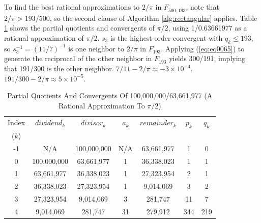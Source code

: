 \documentclass{esub2acm}
\begin{document}
To find the best rational approximations to $2/ \pi$ in $F_{500, \overline{193}}$,
note that $2/ \pi > 193/500$, so the second clause of Algorithm \ref{alg:rectangular}
applies.  Table \ref{tbl:cfexpansrappiovertwo} shows the partial quotients and convergents
of $\pi / 2$, using 1/0.63661977 as a rational approximation of $\pi /2$.  $s_3$
is the highest-order convergent with $q_k \leq 193$, so $s_3^{-1} = (11/7)^{-1}$ is one
neighbor to $2/ \pi$ in $F_{\overline{193}}$.  Applying (\ref{eq:eq0065}) to generate
the reciprocal of the other neighbor in $F_{\overline{193}}$ yields 300/191, implying that
191/300 is the other neighbor.  $7/11 - 2/\pi \approx -3 \times 10^{-4}$.
$191/300 - 2/\pi \approx 5 \times 10^{-5}$.

\begin{table}
\caption{Partial Quotients And Convergents Of 100,000,000/63,661,977
        (A Rational Approximation To $\pi / 2$)}
\label{tbl:cfexpansrappiovertwo}
\begin{center}
\begin{tabular}{|c|c|c|c|c|c|c|}
\hline
\small{Index} & \small{$dividend_k$}  & \small{$divisor_k$} & \small{$a_k$}   & \small{$remainder_k$} & \small{$p_k$}      & \small{$q_k$}       \\
\small{($k$)} &                       &                     &                 &                       &                    &                     \\
\hline
\hline
\small{-1}    & \small{N/A}           & \small{100,000,000} & \small{N/A}     & \small{63,661,977}    & \small{1}          & \small{0}           \\
\hline
\small{0}     & \small{100,000,000}   & \small{63,661,977}  & \small{1}       & \small{36,338,023}    & \small{1}          & \small{1}           \\
\hline
\small{1}     & \small{63,661,977}    & \small{36,338,023}  & \small{1}       & \small{27,323,954}    & \small{2}          & \small{1}           \\
\hline
\small{2}     & \small{36,338,023}    & \small{27,323,954}  & \small{1}       & \small{9,014,069}     & \small{3}          & \small{2}           \\
\hline
\small{3}     & \small{27,323,954}    & \small{9,014,069}   & \small{3}       & \small{281,747}       & \small{11}         & \small{7}           \\
\hline
\small{4}     & \small{9,014,069}     & \small{281,747}     & \small{31}      & \small{279,912}       & \small{344}        & \small{219}         \\

\end{tabular}
\end{center}
\end{table}
\end{document}
